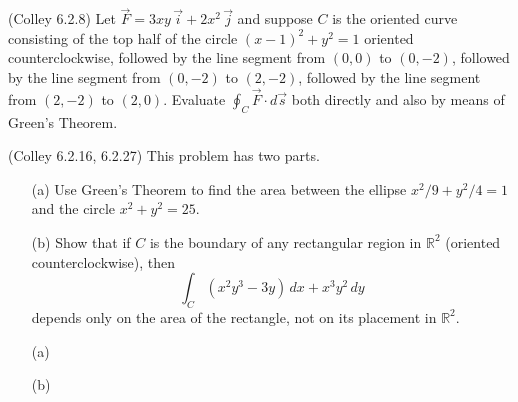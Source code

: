 \documentclass[11pt,letterpaper,cm]{nupset}
\begin{document}
\begin{problem}[Exercise 6] (Colley 6.2.8) Let $\vec{F}=3xy\,\vec{i}+2x^2\,\vec{j}$ and suppose $C$ is the oriented curve consisting of the top half of the circle $(x-1)^2+y^2=1$ oriented counterclockwise, followed by the line segment from $(0,0)$ to $(0,-2)$, followed by the line segment from $(0,-2)$ to $(2,-2)$, followed by the line segment from $(2,-2)$ to $(2,0)$. Evaluate $\oint_C \vec{F} \cdot d\vec{s}$ both directly and also by means of Green's Theorem.
\end{problem}
\begin{solution}
\end{solution}
\newpage

\begin{problem}[Exercise 7] (Colley 6.2.16, 6.2.27) This problem has two parts.
	\begin{itemize}
		\item[(a)] Use Green's Theorem to find the area between the ellipse $x^2/9+y^2/4=1$ and the circle $x^2+y^2=25$.
		\item[(b)] Show that if $C$ is the boundary of any rectangular region in $\mathbb{R}^2$ (oriented counterclockwise), then
		$$\int_C (x^2y^3-3y)\,dx + x^3y^2\,dy$$
		depends only on the area of the rectangle, not on its placement in $\mathbb{R}^2$.
	\end{itemize}
\end{problem}
\begin{solution}
	\begin{itemize}
		\item[(a)] 
		\item[(b)] 
	\end{itemize}
\end{solution}
\newpage
\end{document}
